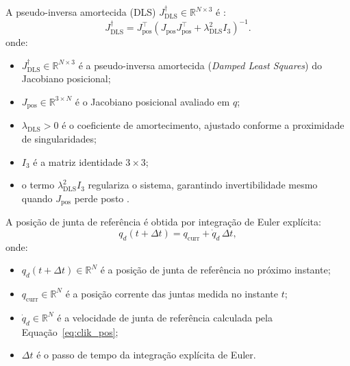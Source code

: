 A pseudo-inversa amortecida (DLS) $J_{\text{DLS}}^{\dagger} \in \mathbb{R}^{N \times 3}$ é \cite{nakamura1986inverse, wampler2007manipulator}:
\begin{equation}
    J_{\text{DLS}}^{\dagger} = J_{\text{pos}}^\top \left(J_{\text{pos}} J_{\text{pos}}^\top + \lambda_{\text{DLS}}^2 I_3\right)^{-1}.
    \label{eq:dls_pos}
\end{equation}
onde:
\begin{itemize}
    \item $J_{\text{DLS}}^{\dagger} \in \mathbb{R}^{N \times 3}$ é a pseudo-inversa amortecida (\textit{Damped Least Squares}) do Jacobiano posicional;
    \item $J_{\text{pos}} \in \mathbb{R}^{3 \times N}$ é o Jacobiano posicional avaliado em $q$;
    \item $\lambda_{\text{DLS}} > 0$ é o coeficiente de amortecimento, ajustado conforme a proximidade de singularidades;
    \item $I_3$ é a matriz identidade $3 \times 3$;
    \item o termo $\lambda_{\text{DLS}}^2 I_3$ regulariza o sistema, garantindo invertibilidade mesmo quando $J_{\text{pos}}$ perde posto \cite{nakamura1986inverse, wampler2007manipulator}.
\end{itemize}

A posição de junta de referência é obtida por integração de Euler explícita:
\begin{equation}
    q_d(t + \Delta t) = q_{\text{curr}} + \dot{q}_d\, \Delta t,
    \label{eq:clik_q_int}
\end{equation}
onde:
\begin{itemize}
    \item $q_d(t + \Delta t) \in \mathbb{R}^N$ é a posição de junta de referência no próximo instante;
    \item $q_{\text{curr}} \in \mathbb{R}^N$ é a posição corrente das juntas medida no instante $t$;
    \item $\dot{q}_d \in \mathbb{R}^N$ é a velocidade de junta de referência calculada pela Equação~\eqref{eq:clik_pos};
    \item $\Delta t$ é o passo de tempo da integração explícita de Euler.
\end{itemize}

